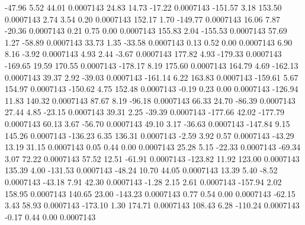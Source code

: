       -47.96        5.52       44.01     0.0007143
       24.83       14.73      -17.22     0.0007143
     -151.57        3.18      153.50     0.0007143
        2.74        3.54        0.20     0.0007143
      152.17        1.70     -149.77     0.0007143
       16.06        7.87      -20.36     0.0007143
        0.21        0.75        0.00     0.0007143
      155.83        2.04     -155.53     0.0007143
       57.69        1.27      -58.89     0.0007143
       33.73        1.35      -33.58     0.0007143
        0.13        0.52        0.00     0.0007143
        6.90        8.16       -3.92     0.0007143
        4.93        2.44       -3.67     0.0007143
      177.82        4.93     -179.33     0.0007143
     -169.65       19.59      170.55     0.0007143
     -178.17        8.19      175.60     0.0007143
      164.79        4.69     -162.13     0.0007143
       39.37        2.92      -39.03     0.0007143
     -161.14        6.22      163.83     0.0007143
     -159.61        5.67      154.97     0.0007143
     -150.62        4.75      152.48     0.0007143
       -0.19        0.23        0.00     0.0007143
     -126.94       11.83      140.32     0.0007143
       87.67        8.19      -96.18     0.0007143
       66.33       24.70      -86.39     0.0007143
       27.44        4.85      -23.15     0.0007143
       39.31        2.25      -39.39     0.0007143
     -177.66       42.02     -177.79     0.0007143
       60.13        3.67      -56.70     0.0007143
       49.10        3.17      -36.63     0.0007143
     -147.84        9.15      145.26     0.0007143
     -136.23        6.35      136.31     0.0007143
       -2.59        3.92        0.57     0.0007143
      -43.29       13.19       31.15     0.0007143
        0.05        0.44        0.00     0.0007143
       25.28        5.15      -22.33     0.0007143
      -69.34        3.07       72.22     0.0007143
       57.52       12.51      -61.91     0.0007143
     -123.82       11.92      123.00     0.0007143
      135.39        4.00     -131.53     0.0007143
      -48.24       10.70       44.05     0.0007143
       13.39        5.40       -8.52     0.0007143
      -43.18        7.91       42.30     0.0007143
       -1.28        2.15        2.61     0.0007143
     -157.94        2.02      158.95     0.0007143
      140.65       23.00     -143.23     0.0007143
        0.77        0.54        0.00     0.0007143
      -62.15        3.43       58.93     0.0007143
     -173.10        1.30      174.71     0.0007143
      108.43        6.28     -110.24     0.0007143
       -0.17        0.44        0.00     0.0007143

